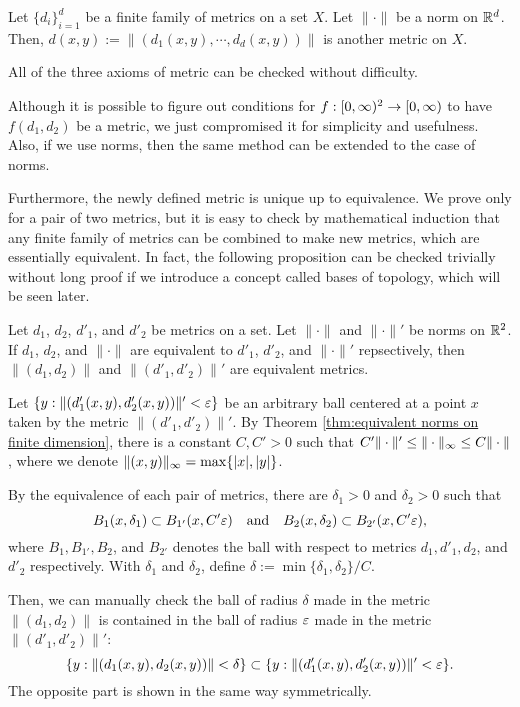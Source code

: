 \begin{prop}
Let $\{d_i\}_{i=1}^d$ be a finite family of metrics on a set $X$.
Let $\|\cdot\|$ be a norm on $\mathbb{R}^d$.
Then, $d(x,y):=\|(d_1(x,y),\cdots,d_d(x,y))\|$ is another metric on $X$.
\end{prop}
\begin{pf}
All of the three axioms of metric can be checked without difficulty.
\end{pf}
\begin{rmk}
Although it is possible to figure out conditions for $f:[0,\oo)^2\to[0,\oo)$ to have $f(d_1,d_2)$ be a metric, we just compromised it for simplicity and usefulness.
Also, if we use norms, then the same method can be extended to the case of norms.
\end{rmk}

Furthermore, the newly defined metric is unique up to equivalence.
We prove only for a pair of two metrics, but it is easy to check by mathematical induction that any finite family of metrics can be combined to make new metrics, which are essentially equivalent.
In fact, the following proposition can be checked trivially without long proof if we introduce a concept called bases of topology, which will be seen later.

\begin{prop}
Let $d_1$, $d_2$, $d'_1$, and $d'_2$ be metrics on a set.
Let $\|\cdot\|$ and $\|\cdot\|'$ be norms on $\mathbb{R}^2$.
If $d_1$, $d_2$, and $\|\cdot\|$ are equivalent to $d'_1$, $d'_2$, and $\|\cdot\|'$ repsectively, then $\|(d_1,d_2)\|$ and $\|(d'_1,d'_2)\|'$ are equivalent metrics.
\end{prop}
\begin{pf}
Let $\{y:\|(d'_1(x,y),d'_2(x,y))\|'<\varepsilon\}$ be an arbitrary ball centered at a point $x$ taken by the metric $\|(d'_1,d'_2)\|'$.
By Theorem \ref{thm:equivalent norms on finite dimension}, there is a constant $C,C'>0$ such that $C'\|\cdot\|'\le\|\cdot\|_\infty\le C\|\cdot\|$, where we denote $\|(x,y)\|_\infty=\max\{|x|,|y|\}$.

By the equivalence of each pair of metrics, there are $\delta_1>0$ and $\delta_2>0$ such that
\[B_1(x,\delta_1)\subset B_{1'}(x,C'\varepsilon)\quad\text{and}\quad B_2(x,\delta_2)\subset B_{2'}(x,C'\varepsilon),\]
where $B_1,B_{1'},B_2$, and $B_{2'}$ denotes the ball with respect to metrics $d_1,d'_1,d_2$, and $d'_2$ respectively.
With $\delta_1$ and $\delta_2$, define $\delta:=\min\{\delta_1,\delta_2\}/C$.

Then, we can manually check the ball of radius $\delta$ made in the metric $\|(d_1,d_2)\|$ is contained in the ball of radius $\varepsilon$ made in the metric $\|(d'_1,d'_2)\|'$:
\[\{y:\|(d_1(x,y),d_2(x,y))\|<\delta\}\subset\{y:\|(d'_1(x,y),d'_2(x,y))\|'<\varepsilon\}.\]
The opposite part is shown in the same way symmetrically.
\end{pf}

